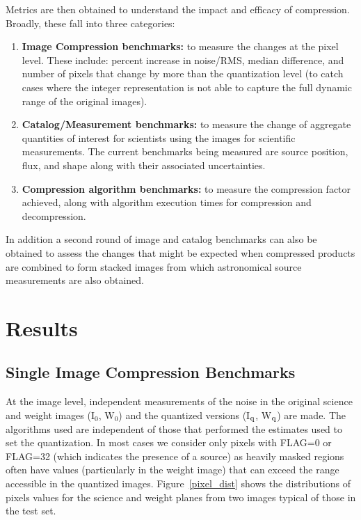 Metrics are then obtained to understand the impact and efficacy of compression.  Broadly, 
these fall into three categories:
\begin{enumerate}
\item {\bf Image Compression benchmarks:} to measure the changes at the pixel level.  These
include: percent increase in noise/RMS, median difference, and number of pixels that change
by more than the quantization level (to catch cases where the integer representation is not 
able to capture the full dynamic range of the original images).

\item {\bf Catalog/Measurement benchmarks:} to measure the change of aggregate quantities
of interest for scientists using the images for scientific measurements.  The current
benchmarks being measured are source position, flux, and shape along with their associated
uncertainties.

\item {\bf Compression algorithm benchmarks:} to measure the compression factor achieved, along with
algorithm execution times for compression and decompression.
\end{enumerate}
In addition a second round of image and catalog benchmarks can also be obtained to assess
the changes that might be expected when compressed products are combined to form stacked
images from which astronomical source measurements are also obtained.


\section{Results}

\subsection{Single Image Compression Benchmarks}

At the image level, independent measurements of the noise in the original science 
and weight images (I$_{0}$, W$_{0}$) and the quantized versions (I$_{\rm q}$, W$_{\rm q}$) are made.
The algorithms used are independent of those that performed the estimates used to set the quantization.
In most cases we consider only pixels with FLAG=0 or FLAG=32 (which indicates the presence of a source)
as heavily masked regions often have values (particularly in the weight image) that can exceed the 
range accessible in the quantized images.  Figure~\ref{pixel_dist} shows the distributions of pixels
values for the science and weight planes from two images typical of those in the test set.

